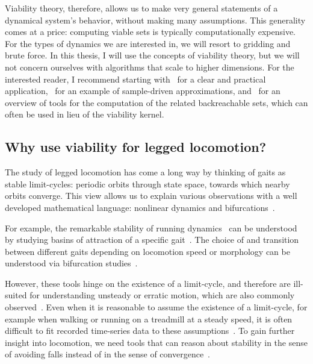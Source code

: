 Viability theory, therefore, allows us to make very general statements of a dynamical system's behavior, without making many assumptions. This generality comes at a price: computing viable sets is typically computationally expensive. For the types of dynamics we are interested in, we will resort to gridding and brute force. In this thesis, I will use the concepts of viability theory, but we will not concern ourselves with algorithms that scale to higher dimensions. For the interested reader, I recommend starting with~\cite{liniger2017real} for a clear and practical application,~\cite{deffuant2007approximating} for an example of sample-driven approximations, and~\cite{bansal2017hamilton} for an overview of tools for the computation of the related backreachable sets, which can often be used in lieu of the viability kernel.

\subsection{Why use viability for legged locomotion?}

The study of legged locomotion has come a long way by thinking of gaits as stable limit-cycles: periodic orbits through state space, towards which nearby orbits converge. This view allows us to explain various observations with a well developed mathematical language: nonlinear dynamics and bifurcations~\cite{strogatz2018nonlinear}. \par
For example, the remarkable stability of running dynamics~\cite{daley2006running} can be understood by studying basins of attraction of a specific gait~\cite{merker2015stable,cnops2015basin}. The choice of and transition between different gaits depending on locomotion speed or morphology can be understood via bifurcation studies~\cite{owaki2013simple,aoi2013stability,gan2018all}. \par

However, these tools hinge on the existence of a limit-cycle, and therefore are ill-suited for understanding unsteady or erratic motion, which are also commonly observed~\cite{wheatley2015escape,moore2017unpredictability}.
Even when it is reasonable to assume the existence of a limit-cycle, for example when walking or running on a treadmill at a steady speed, it is often difficult to fit recorded time-series data to these assumptions~\cite{bruijn2013assessing, maus2015constructing}. To gain further insight into locomotion, we need tools that can reason about stability in the sense of avoiding falls instead of in the sense of convergence~\cite{Birn-Jeffery3786}. \par

